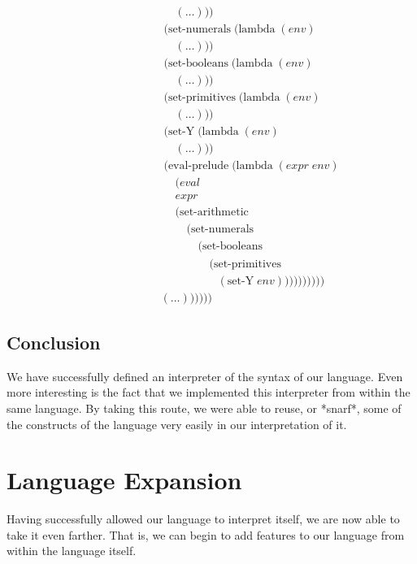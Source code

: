 \begin{align*}
\\& \qquad \qquad \qquad \quad \; (\dots)))
\\& \qquad \qquad \qquad \; (\text{set-numerals} \; (\text{lambda} \; (env)
\\& \qquad \qquad \qquad \quad \; (\dots)))
\\& \qquad \qquad \qquad \; (\text{set-booleans} \; (\text{lambda} \; (env)
\\& \qquad \qquad \qquad \quad \; (\dots)))
\\& \qquad \qquad \qquad \; (\text{set-primitives} \; (\text{lambda} \; (env)
\\& \qquad \qquad \qquad \quad \; (\dots)))
\\& \qquad \qquad \qquad \; (\text{set-Y} \; (\text{lambda} \; (env)
\\& \qquad \qquad \qquad \quad \; (\dots)))
\\& \qquad \qquad \qquad \; (\text{eval-prelude} \; (\text{lambda} \; (expr \; env)
\\& \qquad \qquad \qquad \quad \; (eval
\\& \qquad \qquad \qquad \quad \; expr
\\& \qquad \qquad \qquad \quad \; (\text{set-arithmetic}
\\& \qquad \qquad \qquad \qquad \; (\text{set-numerals}
\\& \qquad \qquad \qquad \qquad \quad \; (\text{set-booleans}
\\& \qquad \qquad \qquad \qquad \qquad \; (\text{set-primitives}
\\& \qquad \qquad \qquad \qquad \qquad \quad (\text{set-Y} \; env))))))))))
\\& \qquad \qquad \qquad (\dots))))))
\end{align*}

\subsection{Conclusion}
We have successfully defined an interpreter of the syntax of our language.
Even more interesting is the fact that we implemented this interpreter from
within the same language. By taking this route, we were able to reuse, or
*snarf*, some of the constructs of the language very easily in our
interpretation of it.

\section{Language Expansion}
Having successfully allowed our language to interpret itself, we are now able
to take it even farther. That is, we can begin to add features to our
language from within the language itself.

